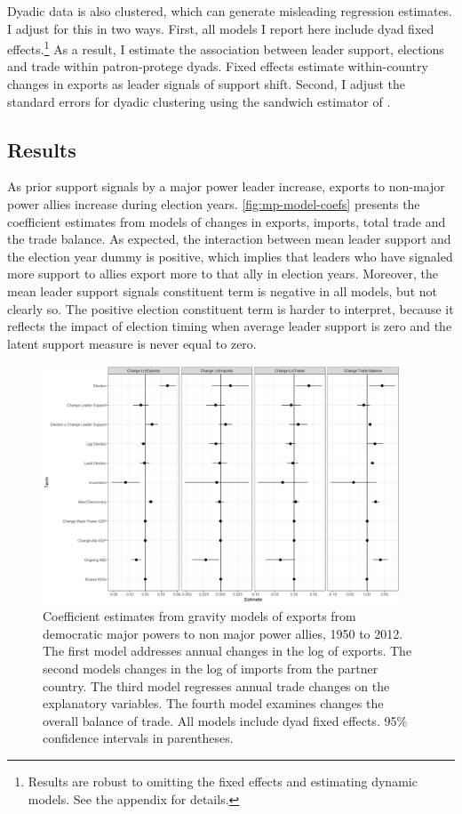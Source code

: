 \documentclass[12pt]{article}
\begin{document}
Dyadic data is also clustered, which can generate misleading regression estimates.
I adjust for this in two ways. 
First, all models I report here include dyad fixed effects.\footnote{Results are robust to omitting the fixed effects and estimating dynamic models. See the appendix for details.}
As a result, I estimate the association between leader support, elections and trade within patron-protege dyads. 
Fixed effects estimate within-country changes in exports as leader signals of support shift.
Second, I adjust the standard errors for dyadic clustering using the sandwich estimator of \citep{Aronowetal2015}.




\subsection{Results}


As prior support signals by a major power leader increase, exports to non-major power allies increase during election years. 
\autoref{fig:mp-model-coefs} presents the coefficient estimates from models of changes in exports, imports, total trade and the trade balance. 
As expected, the interaction between mean leader support and the election year dummy is positive, which implies that leaders who have signaled more support to allies export more to that ally in election years. 
Moreover, the mean leader support signals constituent term is negative in all models, but not clearly so. 
The positive election constituent term is harder to interpret, because it reflects the impact of election timing when average leader support is zero and the latent support measure is never equal to zero. 


\begin{figure}
\centering
\includegraphics[width=0.95\textwidth]{../figures/mp-model-coefs.png}
\caption{Coefficient estimates from gravity models of exports from democratic major powers to non major power allies, 1950 to 2012. The first model addresses annual changes in the log of exports. The second models changes in the log of imports from the partner country. The third model regresses annual trade changes on the explanatory variables. The fourth model examines changes the overall balance of trade. All models include dyad fixed effects. 95\% confidence intervals in parentheses.}
\label{fig:mp-model-coefs}
\end{figure}
\end{document}
